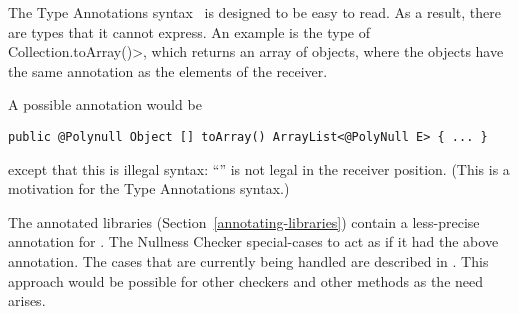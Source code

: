 The Type Annotations syntax~\cite{jsr308} is designed to be easy to read.  As a result,
there are types that it cannot express.  An example is the type of
\<Collection.toArray()>, which returns an array of objects, where the
objects have the same annotation as the elements of the receiver.

A possible annotation would be

\begin{Verbatim}
public @Polynull Object [] toArray() ArrayList<@PolyNull E> { ... }
\end{Verbatim}

\noindent
except that this is illegal syntax:  ``'' is
not legal in the receiver position.  (This is a motivation for
the Type Annotations syntax.)

The annotated libraries (Section~\ref{annotating-libraries}) contain a less-precise annotation for
.  The Nullness Checker special-cases  to
act as if it had the above annotation.  The cases that
are currently being handled are described in
.
This approach would be possible for other checkers and other methods as the
need arises.


